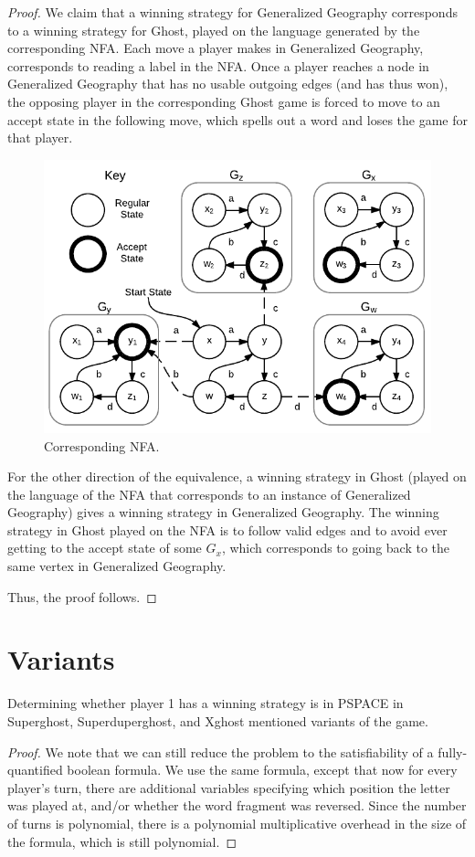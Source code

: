 \documentclass[runningheads,a4paper]{llncs}
\begin{document}
\begin{proof}
We claim that a winning strategy for Generalized Geography corresponds to a winning strategy for Ghost, played on the language generated by the corresponding NFA. Each move a player makes in Generalized Geography, corresponds to reading a label in the NFA. Once a player reaches a node in Generalized Geography that has no usable outgoing edges (and has thus won), the opposing player in the corresponding Ghost game is forced to move to an accept state in the following move, which spells out a word and loses the game for that player. 


\begin{figure}[!ht]
\centering
\includegraphics[width=0.6\linewidth]{Ghost2.pdf}
\caption{Corresponding NFA.}
\label{fig:reduction}
\end{figure}

For the other direction of the equivalence, a winning strategy in Ghost (played on the language of the NFA that corresponds to an instance of Generalized Geography) gives a winning strategy in Generalized Geography. The winning strategy in Ghost played on the NFA is to follow valid edges and to avoid ever getting to the accept state of some $G_x$, which corresponds to going back to the same vertex in Generalized Geography.

Thus, the proof follows. 
\end{proof}

\section{Variants}
\label{Variants}

\begin{corollary}
Determining whether player 1 has a winning strategy is in PSPACE in Superghost, Superduperghost, and Xghost mentioned variants of the game.
\end{corollary}

\begin{proof}
We note that we can still reduce the problem to the satisfiability of a fully-quantified boolean formula. We use the same formula, except that now for every player's turn, there are additional variables specifying which position the letter was played at, and/or whether the word fragment was reversed. Since the number of turns is polynomial, there is a polynomial multiplicative overhead in the size of the formula, which is still polynomial. 
\end{proof}
\end{document}
